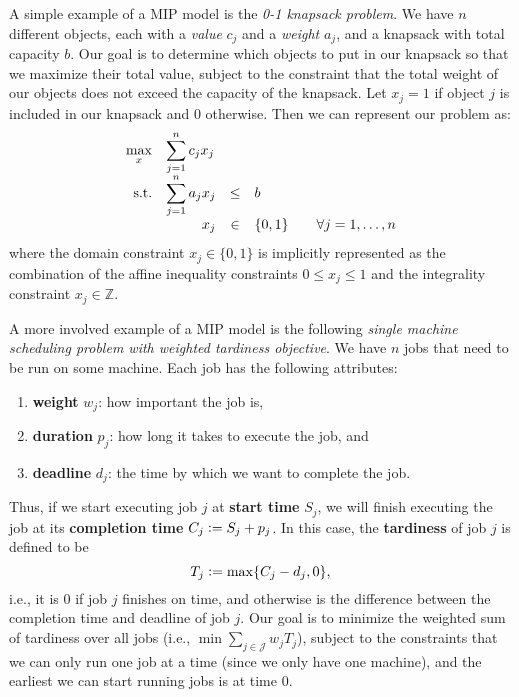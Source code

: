 \documentclass[12pt]{article}
\begin{document}
A simple example of a MIP model is the \emph{0-1 knapsack problem}. We have $n$ different objects, each with a \emph{value} $c_j$ and a \emph{weight} $a_j$, and a knapsack with total capacity $b$. Our goal is to determine which objects to put in our knapsack so that we maximize their total value, subject to the constraint that the total weight of our objects does not exceed the capacity of the knapsack. Let $x_j = 1$ if object $j$ is included in our knapsack and $0$ otherwise. Then we can represent our problem as:
\begin{equation*}
\begin{array}{rrclcl}
    \displaystyle \max_x & \multicolumn{3}{l}{\displaystyle \sum_{j=1}^n c_j x_j} \\
    \textrm{s.t.} & \displaystyle \sum_{j=1}^n a_j x_j & \le & b \\
    & x_j & \in & \{0, 1\} && \forall j = 1, \dots, n
\end{array}
\end{equation*}
where the domain constraint $x_j \in \{0,1\}$ is implicitly represented as the combination of the affine inequality constraints $0 \le x_j \le 1$ and the integrality constraint $x_j \in \mathbb{Z}$.

A more involved example of a MIP model is the following \emph{single machine scheduling problem with weighted tardiness objective}. We have $n$ jobs that need to be run on some machine. Each job has the following attributes:
\begin{enumerate}
    \item \textbf{weight} $w_j$: how important the job is,
    \item \textbf{duration} $p_j$: how long it takes to execute the job, and
    \item \textbf{deadline} $d_j$: the time by which we want to complete the job.
\end{enumerate}
Thus, if we start executing job $j$ at \textbf{start time} $S_j$, we will finish executing the job at its \textbf{completion time} $C_j \mathrel{\mathop:}= S_j + p_j$. In this case, the \textbf{tardiness} of job $j$ is defined to be
\[T_j \mathrel{\mathop:}= \max\{C_j - d_j, 0\},\]
i.e., it is $0$ if job $j$ finishes on time, and otherwise is the difference between the completion time and deadline of job $j$. Our goal is to minimize the weighted sum of tardiness over all jobs (i.e., $\min \sum_{j \in \mathcal{J}} w_j T_j$), subject to the constraints that we can only run one job at a time (since we only have one machine), and the earliest we can start running jobs is at time $0$.
\end{document}
